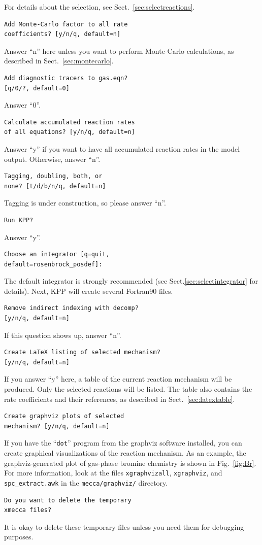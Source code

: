 \documentclass[twoside]{article}
\begin{document}
For details about the selection, see Sect.~\ref{sec:selectreactions}.
\begin{verbatim}
Add Monte-Carlo factor to all rate
coefficients? [y/n/q, default=n]
\end{verbatim}
Answer ``n'' here unless you want to perform Monte-Carlo calculations,
as described in Sect.~\ref{sec:montecarlo}.
\begin{verbatim}
Add diagnostic tracers to gas.eqn?
[q/0/?, default=0]
\end{verbatim}
Answer ``0''.
\begin{verbatim}
Calculate accumulated reaction rates
of all equations? [y/n/q, default=n]
\end{verbatim}
Answer ``y'' if you want to have all accumulated reaction rates in the
model output. Otherwise, answer ``n''.
\begin{verbatim}
Tagging, doubling, both, or
none? [t/d/b/n/q, default=n]
\end{verbatim}
Tagging is under construction, so please answer ``n''.
\begin{verbatim}
Run KPP?
\end{verbatim}
Answer ``y''.
\begin{verbatim}
Choose an integrator [q=quit,
default=rosenbrock_posdef]:
\end{verbatim}
The default integrator is strongly recommended (see
Sect.\ref{sec:selectintegrator} for details). Next, KPP will create
several Fortran90 files.
\begin{verbatim}
Remove indirect indexing with decomp?
[y/n/q, default=n]
\end{verbatim}
If this question shows up, answer ``n''.
\begin{verbatim}
Create LaTeX listing of selected mechanism?
[y/n/q, default=n]
\end{verbatim}
If you answer ``y'' here, a table of the current reaction mechanism will
be produced. Only the selected reactions will be listed. The table also
contains the rate coefficients and their references, as described in
Sect.~\ref{sec:latextable}.
\begin{verbatim}
Create graphviz plots of selected
mechanism? [y/n/q, default=n]
\end{verbatim}
If you have the ``\verb|dot|'' program from the graphviz software
installed, you can create graphical visualizations of the reaction
mechanism. As an example, the graphviz-generated plot of gas-phase
bromine chemistry is shown in Fig.~\ref{fig:Br}. For more information,
look at the files \verb|xgraphvizall|, \verb|xgraphviz|, and
\verb|spc_extract.awk| in the \verb|mecca/graphviz/| directory.
\begin{verbatim}
Do you want to delete the temporary
xmecca files?
\end{verbatim}
It is okay to delete these temporary files unless you need them for
debugging purposes.
\end{document}

